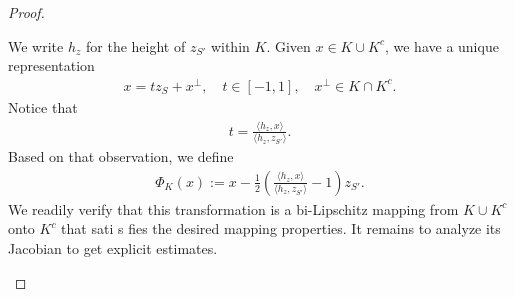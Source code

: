 \documentclass[10pt,letterpaper]{article}
\newcommand\cye[1]{%
  \protect\leavevmode
  \begingroup
    \color{red!35!yellow}%
    #1%
  \endgroup
}
\begin{document}
\begin{proof}
\begin{itemize}
        We write $h_{z}$ for the height of $z_{S'}$ within $K$.
        Given $x \in K \cup K^{c}$, we have a unique representation
        \begin{align*}
            x = t z_{S} + x^{\perp}, \quad t \in [-1,1], \quad x^{\perp} \in K \cap K^{c}.
        \end{align*}
        Notice that 
        \begin{align*}
            t = \frac{\langle h_{z},x\rangle}{\langle h_{z},z_{S'}\rangle} 
            .
        \end{align*}
        Based on that observation, we define 
        \begin{align*}
            \Phi_{K}(x) := x - \frac 1 2 \left( \frac{\langle h_{z},x\rangle}{\langle h_{z},z_{S'}\rangle} - 1 \right) z_{S'}
            .
        \end{align*}
        We readily verify that this transformation is a bi-Lipschitz mapping from $K \cup K^{c}$ onto $K^{c}$
        that sati\cye{s}fies the desired mapping properties. 
        It remains to analyze its Jacobian to get explicit estimates. 
        

\end{itemize}
\end{proof}
\end{document}

